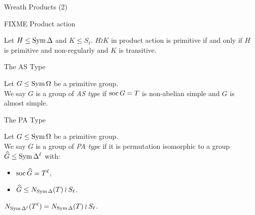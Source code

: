 \begin{frame}{Wreath Products (2)}
    \begin{defn}
        FIXME Product action
    \end{defn}
    \vspace{1em}
    \pause

    \begin{thm}
        Let $H \leq \operatorname{Sym} \Delta$ and $K \leq S_\ell$.
        $H \wr K$ in product action is primitive
        if and only if
        $H$ is primitive and non-regularly and $K$ is transitive.
    \end{thm}
\end{frame}


\begin{frame}{The AS Type}
    \begin{defn}
        Let $G \leq \operatorname{Sym} \Omega$ be a primitive group.
        \\
        We say $G$ is a group of \emph{AS type} if
        $\operatorname{soc} G = T$ is non-abelian simple
        and $G$ is almost simple.
    \end{defn}
\end{frame}

\begin{frame}{The PA Type}
    \begin{defn}
        Let $G \leq \operatorname{Sym} \Omega$ be a primitive group.
        \\
        We say $G$ is a group of \emph{PA type} if it is permutation
        isomorphic to a group $\widehat{G} \leq \operatorname{Sym} \Delta ^ \ell$ with:
        \vspace{-0.5em}
        \pause
        \begin{itemize}
            \item
            $\operatorname{soc} \widehat{G} = T ^ \ell$,
            \pause
            \item
            $\widehat{G} \leq N_{\operatorname{Sym} \Delta}(T) \wr S_\ell$.
        \end{itemize}
    \end{defn}

    \begin{lemma}
        $N_{\operatorname{Sym} \Delta ^ \ell}( T ^ \ell ) = N_{\operatorname{Sym} \Delta}(T) \wr S_\ell$.
    \end{lemma}
\end{frame}



